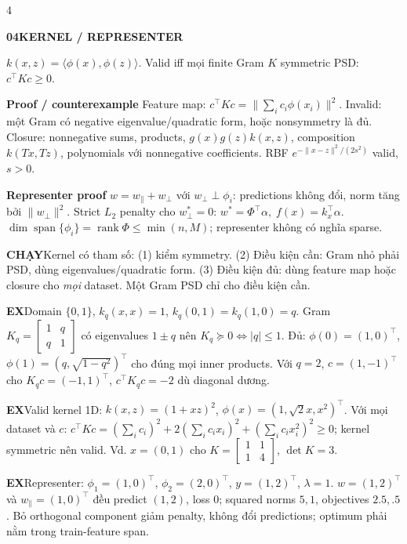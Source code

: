 \documentclass[a4paper]{article}
\newcommand{\topic}[2]{\par\addvspace{.8pt}%
  \begingroup\setlength{\fboxsep}{0.5pt}%
  \noindent\colorbox{structure}{\parbox{\dimexpr\linewidth-2\fboxsep\relax}{%
    \color{white}\fontsize{6.5}{7.1}\selectfont\bfseries #1\enspace #2}}%
  \endgroup\par\nobreak\vspace{.3pt}\nobreak}
\newcommand{\run}[1]{\key{CHẠY}#1}
\newcommand{\key}[1]{\par\textcolor{structure}{\textbf{#1}}\enspace}
\newcommand{\note}[4]{\par\begingroup\setlength{\fboxsep}{0.15pt}%
  \noindent\colorbox{#1}{\parbox{\dimexpr\linewidth-2\fboxsep\relax}{%
    \RaggedRight\textcolor{#2}{\textbf{#3}}\enspace #4}}%
  \endgroup\par}
\newcommand{\ex}[1]{\note{examplebg}{example}{EX}{#1}}
\newcommand{\norm}[1]{\lVert#1\rVert}
\begin{document}
\begin{multicols*}{4}
\topic{04}{KERNEL / REPRESENTER}
$k(x,z)=\langle\phi(x),\phi(z)\rangle$. Valid iff mọi finite Gram $K$ symmetric PSD: $c^\top Kc\ge0$.
\key{Proof / counterexample}
Feature map: $c^\top Kc=\norm{\sum_ic_i\phi(x_i)}^2$. Invalid: một Gram có negative eigenvalue/quadratic form, hoặc nonsymmetry là đủ.
Closure: nonnegative sums, products, $g(x)g(z)k(x,z)$, composition $k(Tx,Tz)$, polynomials với nonnegative coefficients. RBF $e^{-\norm{x-z}^2/(2s^2)}$ valid, $s>0$.
\key{Representer proof}
$w=w_\parallel+w_\perp$ với $w_\perp\perp\phi_i$: predictions không đổi, norm tăng bởi $\norm{w_\perp}^2$. Strict $L_2$ penalty cho $w_\perp^*=0$:
$w^*=\Phi^\top\alpha,\; f(x)=k_x^\top\alpha.$
$\dim\operatorname{span}\{\phi_i\}=\operatorname{rank}\Phi\le\min(n,M)$; representer không có nghĩa sparse.
\run{Kernel có tham số: (1) kiểm symmetry. (2) Điều kiện cần: Gram nhỏ phải PSD, dùng eigenvalues/quadratic form. (3) Điều kiện đủ: dùng feature map hoặc closure cho \emph{mọi} dataset. Một Gram PSD chỉ cho điều kiện cần.}
\ex{Domain $\{0,1\}$, $k_q(x,x)=1$, $k_q(0,1)=k_q(1,0)=q$. Gram $K_q=\left[\begin{smallmatrix}1&q\\q&1\end{smallmatrix}\right]$ có eigenvalues $1\pm q$ nên $K_q\succeq0\iff |q|\le1$. Đủ: $\phi(0)=(1,0)^\top$, $\phi(1)=(q,\sqrt{1-q^2})^\top$ cho đúng mọi inner products. Với $q=2$, $c=(1,-1)^\top$ cho $K_qc=(-1,1)^\top$, $c^\top K_qc=-2$ dù diagonal dương.}
\ex{Valid kernel 1D: $k(x,z)=(1+xz)^2$, $\phi(x)=(1,\sqrt2x,x^2)^\top$. Với mọi dataset và $c$: $c^\top Kc=(\sum_i c_i)^2+2(\sum_i c_ix_i)^2+(\sum_i c_ix_i^2)^2\ge0$; kernel symmetric nên valid. Vd. $x=(0,1)$ cho $K=\left[\begin{smallmatrix}1&1\\1&4\end{smallmatrix}\right]$, $\det K=3$.}
\ex{Representer: $\phi_1=(1,0)^\top$, $\phi_2=(2,0)^\top$, $y=(1,2)^\top$, $\lambda=1$. $w=(1,2)^\top$ và $w_\parallel=(1,0)^\top$ đều predict $(1,2)$, loss $0$; squared norms $5,1$, objectives $2.5,.5$. Bỏ orthogonal component giảm penalty, không đổi predictions; optimum phải nằm trong train-feature span.}


\end{multicols*}
\end{document}
